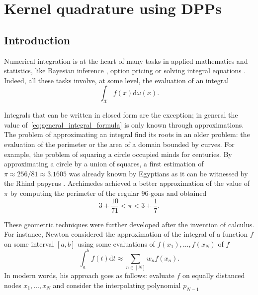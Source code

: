 \documentclass[twoside,11pt]{book}
\numberwithin{theorem}{chapter}
\numberwithin{definition}{chapter}
\numberwithin{proposition}{chapter}
\numberwithin{corollary}{chapter}
\numberwithin{example}{chapter}
\numberwithin{lemma}{chapter}
\numberwithin{assumption}{chapter}
\numberwithin{equation}{chapter}
\numberwithin{figure}{chapter}
\begin{document}
\chapter{Kernel quadrature using DPPs}\label{chap:dppkq}
\section{Introduction}
Numerical integration is at the heart of many tasks in applied mathematics and statistics, like Bayesian inference \parencite{RoCa04}, option pricing \parencite{Gla13} or solving integral equations \parencite{KrMaKo89}. Indeed, all these tasks involve, at some level, the evaluation of an integral
\begin{equation}\label{eq:general_integral_formula}
\int_{\mathcal{X}}f(x)\mathrm{d}\omega(x).
\end{equation}

Integrals that can be written in closed form are the exception; in general the value of~\eqref{eq:general_integral_formula} is only known through approximations. The problem of approximating an integral find its roots in an older problem:
the evaluation of the perimeter or the area of a domain bounded by curves. For example, the problem of squaring a circle occupied minds for centuries. By approximating a circle by a union of squares, a first estimation of $\pi \approx 256/81 \approx 3.1605$ was already known by Egyptians as it can be witnessed by the Rhind papyrus \parencite{RoSh87}. Archimedes achieved a better approximation of the value of $\pi$ by computing the perimeter of the regular 96-gons and obtained \parencite{Hea03}
$$3+\frac{10}{71} < \pi < 3+\frac{1}{7}.$$


 These geometric techniques were further developed after the invention of calculus. For instance, Newton considered the approximation of the integral of a function $f$ on some interval $[a,b]$ using some evaluations of $f(x_{1}), \dots, f(x_{N})$ of $f$
\begin{equation}
\int_{a}^{b}f(t)\mathrm{d}t \approx \sum\limits_{n \in [N]}w_{n}f(x_{n}).
\end{equation}
 In modern words, his approach goes as follows: evaluate $f$ on equally distanced nodes $x_{1}, \dots, x_{N}$ and consider the interpolating polynomial $p_{N-1}$

\end{document}
